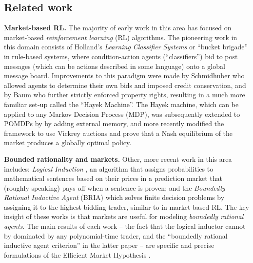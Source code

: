 \subsection{Related work}
\label{mba/sec:related}

\textbf{Market-based RL.} The majority of early work in this area has focused on market-based \emph{reinforcement learning} (RL) algorithms. The pioneering work in this domain consists of Holland's \emph{Learning Classifier Systems} or ``bucket brigade'' \cite{hollandPropertiesBucketBrigade1985a} in rule-based systems, where condition-action agents (``classifiers'') bid to post messages (which can be actions described in some language) onto a global message board. Improvements to this paradigm were made by Schmidhuber \cite{schmidhuberEvolutionaryPrinciplesSelfreferential1987, schmidhuberLocalLearningAlgorithm1989} who allowed agents to determine their own bids and imposed credit conservation, and by Baum \cite{baumModelIntelligenceEconomy1999} who further strictly enforced property rights, resulting in a much more familiar set-up called the ``Hayek Machine''. The Hayek machine, which can be applied to any Markov Decision Process (MDP), was subsequently extended to POMDPs by \cite{kweeMarketBasedReinforcementLearning2001} by adding external memory, and more recently \cite{changDecentralizedReinforcementLearning2020} modified the framework to use Vickrey auctions and prove that a Nash equilibrium of the market produces a globally optimal policy.

\textbf{Bounded rationality and markets.} Other, more recent work in this area includes: \emph{Logical Induction} \cite{garrabrantLogicalInduction2020}, an algorithm that assigns probabilities to mathematical sentences based on their prices in a prediction market that (roughly speaking) pays off when a sentence is proven; and the \emph{Boundedly Rational Inductive Agent} (BRIA) \cite{oesterheldTheoryBoundedInductive2023} which solves finite decision problems by assigning it to the highest-bidding trader, similar to in market-based RL. The key insight of these works is that markets are useful for modeling \emph{boundedly rational agents}. The main results of each work -- the fact that the logical inductor cannot by dominated by any polynomial-time trader, and the ``boundedly rational inductive agent criterion'' in the latter paper -- are specific and precise formulations of the Efficient Market Hypothesis \cite{neymanAlgorithmicBayesianEpistemology2024}.

